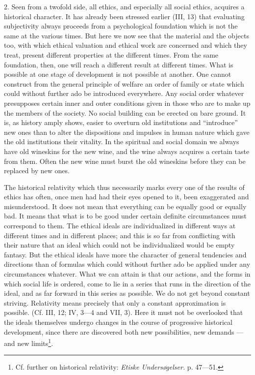\documentclass[12pt,a4paper,openany]{book}
\newcommand{\opage}[1]{\marginnote{\footnotesize\textit{[#1]}}}
\begin{document}
2. Seen from a twofold side, all ethics, and especially all social ethics, acquires a historical character. It has
already been stressed earlier (III, 13) that evaluating subjectivity always proceeds from a psychological foundation
which is not the same at the various times. But here we now see that the material and the objects too, with which
ethical valuation and ethical work are concerned and which they treat, present different properties at the different
times. From the same foundation, then, one will reach a different result at different times. What is possible at one
stage of development is not possible at another. One cannot construct from the general principle of welfare an order of
family or state which could without further ado be introduced everywhere. Any social order whatever presupposes certain
inner and outer conditions given in those who are to make up the members of the society. No social building can be
erected on bare ground. It is, as history amply shows, easier to overturn old
\opage{265}institutions and ``introduce'' new ones than to alter the dispositions and impulses in human nature which
gave the old institutions their vitality. In the spiritual and social domain we always have old wineskins for the new
wine, and the wine always acquires a certain taste from them. Often the new wine must burst the old wineskins before
they can be replaced by new ones. %

The historical relativity which thus necessarily marks every one of the results of ethics has often, once men had had
their eyes opened to it, been exaggerated and misunderstood. It does not mean that everything can be equally good or
equally bad. It means that what is to be good under certain definite circumstances must correspond to them. The ethical
ideals are individualized in different ways at different times and in different places; and this is so far from
conflicting with their nature that an ideal which could not be individualized would be empty fantasy. But the ethical
ideals have more the character of general tendencies and directions than of formulas which could without further ado be
applied under any circumstances whatever. What we can attain is that our actions, and the forms in which social life is
ordered, come to lie in a series that runs in the direction of the ideal, and as far forward in this series as
possible. We do not get beyond constant striving. Relativity means precisely that only a constant approximation is
possible. (Cf. III, 12; IV, 3---4 and VII, 3). Here it must not be overlooked that the ideals themselves undergo changes
in the course of progressive historical development, since there are discovered both new possibilities, new demands
--- and new limits\footnote[1]{Cf. further on historical relativity: \textit{Etiske Undersøgelser.} p. 47---51.}.
\end{document}
